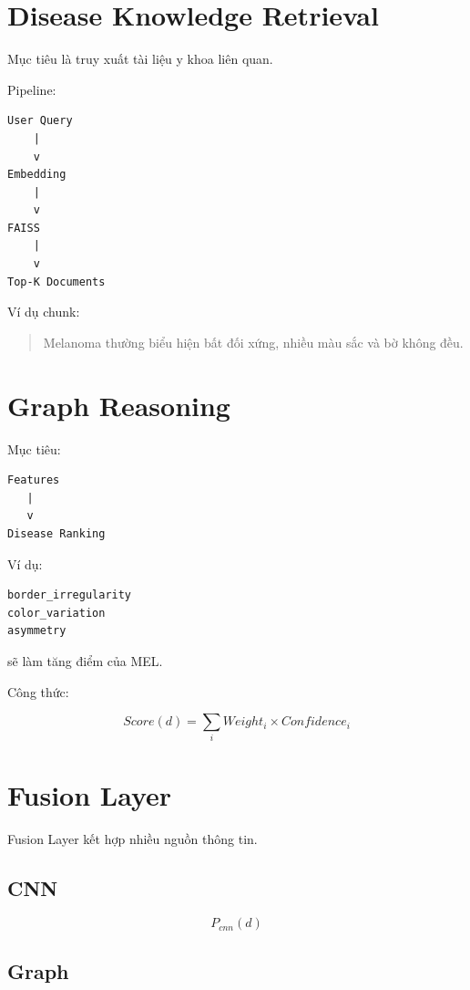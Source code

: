 \documentclass[12pt,a4paper]{article}
\begin{document}
\section{Disease Knowledge Retrieval}

Mục tiêu là truy xuất tài liệu y khoa liên quan.

Pipeline:

\begin{verbatim}
User Query
    |
    v
Embedding
    |
    v
FAISS
    |
    v
Top-K Documents
\end{verbatim}

Ví dụ chunk:

\begin{quote}
Melanoma thường biểu hiện bất đối xứng, nhiều màu sắc và bờ không đều.
\end{quote}

\section{Graph Reasoning}

Mục tiêu:

\begin{verbatim}
Features
   |
   v
Disease Ranking
\end{verbatim}

Ví dụ:

\begin{verbatim}
border_irregularity
color_variation
asymmetry
\end{verbatim}

sẽ làm tăng điểm của MEL.

Công thức:

\[
Score(d)
=
\sum_i
Weight_i \times Confidence_i
\]

\section{Fusion Layer}

Fusion Layer kết hợp nhiều nguồn thông tin.

\subsection{CNN}

\[
P_{cnn}(d)
\]

\subsection{Graph}
\end{document}
